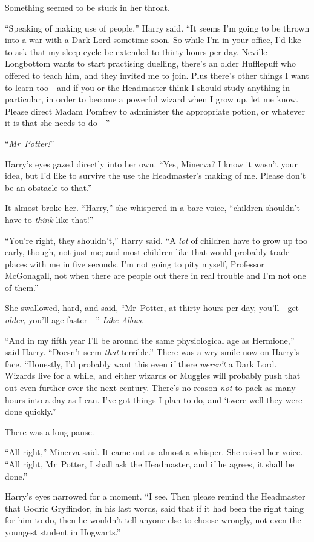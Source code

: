 Something seemed to be stuck in her throat.

“Speaking of making use of people,” Harry said. “It seems I’m going to be thrown into a war with a Dark Lord sometime soon. So while I’m in your office, I’d like to ask that my sleep cycle be extended to thirty hours per day. Neville Longbottom wants to start practising duelling, there’s an older Hufflepuff who offered to teach him, and they invited me to join. Plus there’s other things I want to learn too—and if you or the Headmaster think I should study anything in particular, in order to become a powerful wizard when I grow up, let me know. Please direct Madam Pomfrey to administer the appropriate potion, or whatever it is that she needs to do—”

“\emph{Mr~Potter!}”

Harry’s eyes gazed directly into her own. “Yes, Minerva? I know it wasn’t your idea, but I’d like to survive the use the Headmaster’s making of me. Please don’t be an obstacle to that.”

It almost broke her. “Harry,” she whispered in a bare voice, “children shouldn’t have to \emph{think} like that!”

“You’re right, they shouldn’t,” Harry said. “A \emph{lot} of children have to grow up too early, though, not just me; and most children like that would probably trade places with me in five seconds. I’m not going to pity myself, Professor McGonagall, not when there are people out there in real trouble and I’m not one of them.”

She swallowed, hard, and said, “Mr~Potter, at thirty hours per day, you’ll—get \emph{older,} you’ll age faster—” \emph{Like Albus.}

“And in my fifth year I’ll be around the same physiological age as Hermione,” said Harry. “Doesn’t seem \emph{that} terrible.” There was a wry smile now on Harry’s face. “Honestly, I’d probably want this even if there \emph{weren’t} a Dark Lord. Wizards live for a while, and either wizards or Muggles will probably push that out even further over the next century. There’s no reason \emph{not} to pack as many hours into a day as I can. I’ve got things I plan to do, and ‘twere well they were done quickly.”

There was a long pause.

“All right,” Minerva said. It came out as almost a whisper. She raised her voice. “All right, Mr~Potter, I shall ask the Headmaster, and if he agrees, it shall be done.”

Harry’s eyes narrowed for a moment. “I see. Then please remind the Headmaster that Godric Gryffindor, in his last words, said that if it had been the right thing for him to do, then he wouldn’t tell anyone else to choose wrongly, not even the youngest student in Hogwarts.”

